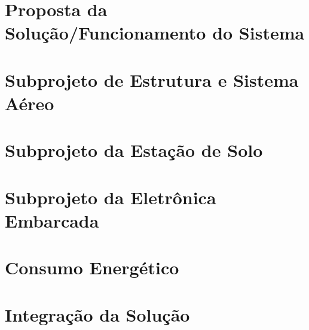 \section{Proposta da Solução/Funcionamento do Sistema} %
\label{sec:proposta_da_solu_o_funcionamento_do_sistema}


\section{Subprojeto de Estrutura e Sistema Aéreo} %
\label{sec:subprojeto_de_estrutura_e_sistema_a_reo}


\section{Subprojeto da Estação de Solo} %
\label{sec:subprojeto_da_esta_o_de_solo}


\section{Subprojeto da Eletrônica Embarcada} %
\label{sec:subprojeto_da_eletr_nica_embarcada}


\section{Consumo Energético} %
\label{sec:consumo_energ_tico}



\section{Integração da Solução} %
\label{sec:integra_o_da_solu_o}


